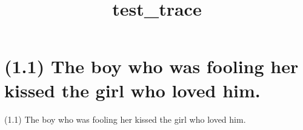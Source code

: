 \documentclass{article}
\begin{document}
%
%

\title{\textbf{test\_trace}}
\maketitle

\clearpage

%
%

\section*{(1.1) The boy who was fooling her kissed the girl who loved him.}

\bigbreak
\begin{enumerate*}
\item[(1.1)] The boy who was fooling her kissed the girl who loved him.
\end{enumerate*}
\bigbreak
\end{document}
